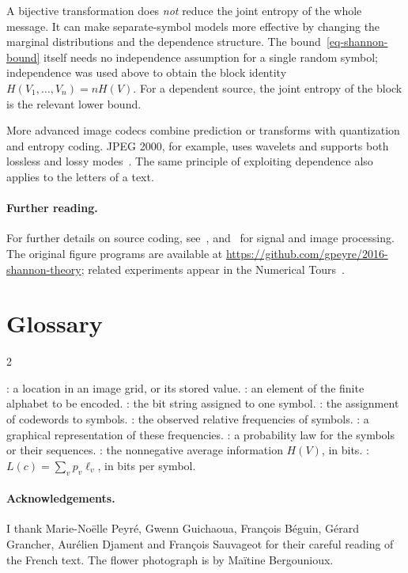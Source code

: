 A bijective transformation does \emph{not} reduce the joint entropy of the whole message. It can make separate-symbol models more effective by changing the marginal distributions and the dependence structure. The bound~\eqref{eq-shannon-bound} itself needs no independence assumption for a single random symbol; independence was used above to obtain the block identity $H(V_1,\ldots,V_n)=nH(V)$. For a dependent source, the joint entropy of the block is the relevant lower bound.

More advanced image codecs combine prediction or transforms with quantization and entropy coding. JPEG 2000, for example, uses wavelets and supports both lossless and lossy modes~\cite{mallat2009a-wav}. The same principle of exploiting dependence also applies to the letters of a text.

\paragraph*{Further reading.}
For further details on source coding, see~\cite{CoverThomas}, and~\cite{mallat2009a-wav} for signal and image processing. The original figure programs are available at \url{https://github.com/gpeyre/2016-shannon-theory}; related experiments appear in the Numerical Tours~\cite{2011-peyre-cise}.

\ifdefined\StandaloneChapter
\par\noindent\begin{minipage}{\linewidth}
\section*{Glossary}
\begin{multicols}{2}\small\raggedright
\begin{rs}
: a location in an image grid, or its stored value.
: an element of the finite alphabet to be encoded.
: the bit string assigned to one symbol.
: the assignment of codewords to symbols.
: the observed relative frequencies of symbols.
: a graphical representation of these frequencies.
: a probability law for the symbols or their sequences.
: the nonnegative average information $H(V)$, in bits.
: $L(c)=\sum_vp_v\ell_v$, in bits per symbol.
\end{rs}
\end{multicols}
\end{minipage}\par
\fi

\ifdefined\StandaloneChapter
\paragraph*{Acknowledgements.}
I thank Marie-Noëlle Peyré, Gwenn Guichaoua, François Béguin, Gérard Grancher, Aurélien Djament and François Sauvageot for their careful reading of the French text. The flower photograph is by Maïtine Bergounioux.
\fi
